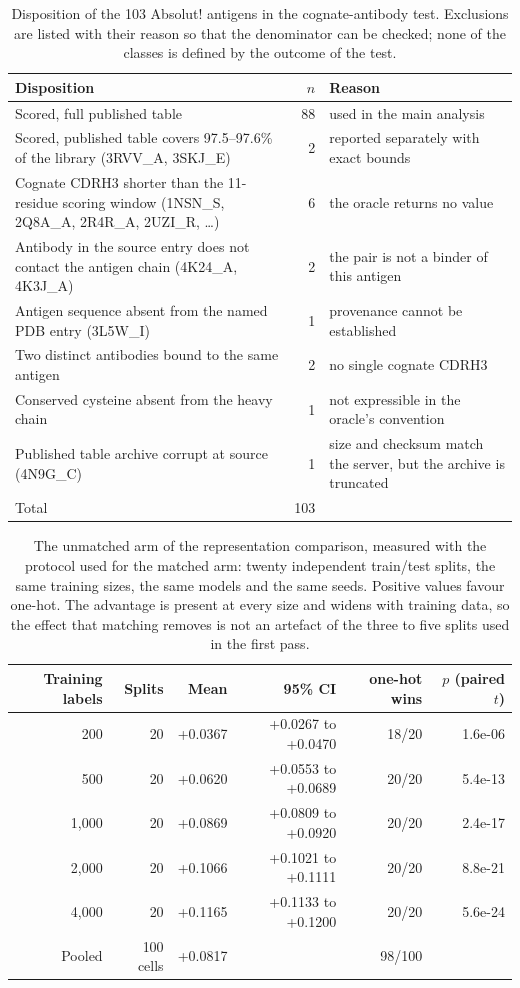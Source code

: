 \documentclass[11pt,a4paper]{article}
\begin{document}
\begin{table}[h]
\caption{Disposition of the 103 Absolut! antigens in the cognate-antibody test. Exclusions are listed with their reason so that the denominator can be checked; none of the classes is defined by the outcome of the test.}
\centering
\begin{tabular}{@{}p{7.4cm}rp{4.4cm}@{}}
\toprule
Disposition & $n$ & Reason \\
\midrule
Scored, full published table & 88 & used in the main analysis \\
Scored, published table covers 97.5--97.6\% of the library (3RVV\_A, 3SKJ\_E) & 2 & reported separately with exact bounds \\
Cognate CDRH3 shorter than the 11-residue scoring window (1NSN\_S, 2Q8A\_A, 2R4R\_A, 2UZI\_R, \ldots) & 6 & the oracle returns no value \\
Antibody in the source entry does not contact the antigen chain (4K24\_A, 4K3J\_A) & 2 & the pair is not a binder of this antigen \\
Antigen sequence absent from the named PDB entry (3L5W\_I) & 1 & provenance cannot be established \\
Two distinct antibodies bound to the same antigen & 2 & no single cognate CDRH3 \\
Conserved cysteine absent from the heavy chain & 1 & not expressible in the oracle's convention \\
Published table archive corrupt at source (4N9G\_C) & 1 & size and checksum match the server, but the archive is truncated \\
\midrule
Total & 103 & \\
\bottomrule
\end{tabular}
\end{table}
\begin{table}[h]
\caption{The unmatched arm of the representation comparison, measured with the protocol used for the matched arm: twenty independent train/test splits, the same training sizes, the same models and the same seeds. Positive values favour one-hot. The advantage is present at every size and widens with training data, so the effect that matching removes is not an artefact of the three to five splits used in the first pass.}
\centering
\begin{tabular}{@{}rrrrrr@{}}
\toprule
Training labels & Splits & Mean & 95\% CI & one-hot wins & $p$ (paired $t$) \\
\midrule
200 & 20 & +0.0367 & +0.0267 to +0.0470 & 18/20 & 1.6e-06 \\
500 & 20 & +0.0620 & +0.0553 to +0.0689 & 20/20 & 5.4e-13 \\
1,000 & 20 & +0.0869 & +0.0809 to +0.0920 & 20/20 & 2.4e-17 \\
2,000 & 20 & +0.1066 & +0.1021 to +0.1111 & 20/20 & 8.8e-21 \\
4,000 & 20 & +0.1165 & +0.1133 to +0.1200 & 20/20 & 5.6e-24 \\
\midrule
Pooled & 100 cells & +0.0817 & & 98/100 & \\
\bottomrule
\end{tabular}
\end{table}
\end{document}
